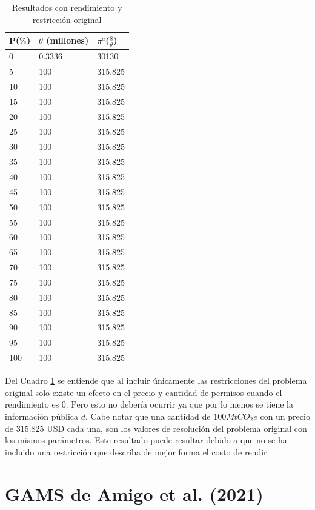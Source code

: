 \begin{table}[H]
\centering
\begin{tabular}{|l|l|l|}
\hline
\textbf{P($\%$)} & \textbf{$\theta$ (millones)} & \textbf{$\pi^a$($\frac{\$}{\theta}$)} \\ \hline
0 & 0.3336 & 30130 \\ \hline
5 & 100 & 315.825 \\ \hline
10 & 100 & 315.825 \\ \hline
15 & 100 & 315.825 \\ \hline
20 & 100 & 315.825 \\ \hline
25 & 100 & 315.825 \\ \hline
30 & 100 & 315.825 \\ \hline
35 & 100 & 315.825 \\ \hline
40 & 100 & 315.825 \\ \hline
45 & 100 & 315.825 \\ \hline
50 & 100 & 315.825 \\ \hline
55 & 100 & 315.825 \\ \hline
60 & 100 & 315.825 \\ \hline
65 & 100 & 315.825 \\ \hline
70 & 100 & 315.825 \\ \hline
75 & 100 & 315.825 \\ \hline
80 & 100 & 315.825 \\ \hline
85 & 100 & 315.825 \\ \hline
90 & 100 & 315.825 \\ \hline
95 & 100 & 315.825 \\ \hline
100 & 100 & 315.825 \\ \hline
\end{tabular}
\caption{Resultados con rendimiento y restricción original}
\label{tabla:conrestr}
\end{table}

Del Cuadro \ref{tabla:conrestr} se entiende que al incluir únicamente las restricciones del problema original solo existe un efecto en el precio y cantidad de permisos cuando el rendimiento es 0. Pero esto no debería ocurrir ya que por lo menos se tiene la información pública $d$. Cabe notar que una cantidad de $100 MtCO_2 e$ con un precio de 315.825 USD cada una, son los valores de resolución del problema original con los mismos parámetros. Este resultado puede resultar debido a que no se ha incluido una restricción que describa de mejor forma el costo de rendir.

\section{GAMS de Amigo et al. (2021)}\label{anexo:GAMScomp}
